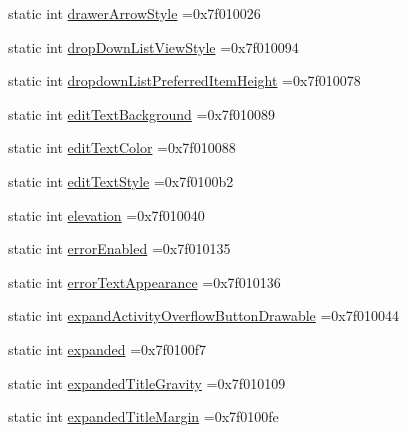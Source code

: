 \begin{DoxyCompactItemize}
\item 
static int \hyperlink{classandroid_1_1support_1_1graphics_1_1drawable_1_1R_1_1attr_ac627577ceb51f500b8595e1337dc20cd}{drawer\+Arrow\+Style} =0x7f010026
\item 
static int \hyperlink{classandroid_1_1support_1_1graphics_1_1drawable_1_1R_1_1attr_a055d4363031c891ac4bd46190d23dd16}{drop\+Down\+List\+View\+Style} =0x7f010094
\item 
static int \hyperlink{classandroid_1_1support_1_1graphics_1_1drawable_1_1R_1_1attr_ac842ae7fca59f1534dc972f35fe6d25f}{dropdown\+List\+Preferred\+Item\+Height} =0x7f010078
\item 
static int \hyperlink{classandroid_1_1support_1_1graphics_1_1drawable_1_1R_1_1attr_a3a2601ac42c85cb1711c6daec302bc75}{edit\+Text\+Background} =0x7f010089
\item 
static int \hyperlink{classandroid_1_1support_1_1graphics_1_1drawable_1_1R_1_1attr_a7d48ea984660f7534e1b0b5cf1f0993f}{edit\+Text\+Color} =0x7f010088
\item 
static int \hyperlink{classandroid_1_1support_1_1graphics_1_1drawable_1_1R_1_1attr_aa3d01d8957e3bf9ec7eddbb57415ef47}{edit\+Text\+Style} =0x7f0100b2
\item 
static int \hyperlink{classandroid_1_1support_1_1graphics_1_1drawable_1_1R_1_1attr_aacf78f2c814c1727339551d5c60e71e4}{elevation} =0x7f010040
\item 
static int \hyperlink{classandroid_1_1support_1_1graphics_1_1drawable_1_1R_1_1attr_ac51b6cc60d1aadf75b34d5f9e6504967}{error\+Enabled} =0x7f010135
\item 
static int \hyperlink{classandroid_1_1support_1_1graphics_1_1drawable_1_1R_1_1attr_a0c0168ca97ec7222d505e2b4c8206b28}{error\+Text\+Appearance} =0x7f010136
\item 
static int \hyperlink{classandroid_1_1support_1_1graphics_1_1drawable_1_1R_1_1attr_aabd2fe64a80a08c45d3b69f8ddd38f9d}{expand\+Activity\+Overflow\+Button\+Drawable} =0x7f010044
\item 
static int \hyperlink{classandroid_1_1support_1_1graphics_1_1drawable_1_1R_1_1attr_abd58fe740dde898b885f4a65ac1dee15}{expanded} =0x7f0100f7
\item 
static int \hyperlink{classandroid_1_1support_1_1graphics_1_1drawable_1_1R_1_1attr_ac3864fc1b12c5f8ec78509acf0183cb1}{expanded\+Title\+Gravity} =0x7f010109
\item 
static int \hyperlink{classandroid_1_1support_1_1graphics_1_1drawable_1_1R_1_1attr_af142a32db0dd08eeb8b6882f7d099086}{expanded\+Title\+Margin} =0x7f0100fe

\end{DoxyCompactItemize}
